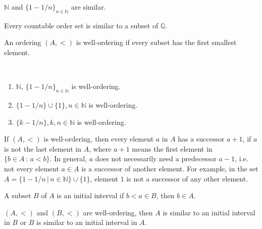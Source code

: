 \medskip

\begin{example}
$\mathbb{N}$ and $\{1 - 1/n\}_{n \in \mathbb{N}}$ are similar.
\end{example}

\medskip

\begin{theorem}
Every countable order set is similar to a subset of $\mathbb{Q}$.
\end{theorem}

\medskip

\begin{definition}
An ordering $(A,<)$ is well-ordering if every subset has the first smallest element.
\end{definition}

\medskip

\begin{example}
~\begin{enumerate}[label=(\alph*)]
    \item $\mathbb{N}$, $\{1 - 1/n\}_{n \in \mathbb{N}}$ is well-ordering.
    
    \item $\{1 - 1/n\} \cup \{1\}, n \in \mathbb{N}$ is well-ordering.
    
    \item $\{k - 1/n\}, k,n \in \mathbb{N}$ is well-ordering.
\end{enumerate}
\end{example}

\medskip

If $(A,<)$ is well-ordering, then every element $a$ in $A$ has a successor $a+1$, if $a$ is not the last element in $A$, where $a+1$ means the first element in $\{b \in A\, : \, a < b\}$. In general, $a$ does not necessarily need a predecessor $a-1$, i.e. not every element $a \in A$ is a successor of another element. For example, in the set $A = \{1 - 1/n\,|\, n\in \mathbb{N}\} \cup \{1\}$, element $1$ is not a successor of any other element.

\medskip

\begin{definition}
A subset $B$ of $A$ is an initial interval if $b < a \in B$, then $b \in A$.
\end{definition}

\medskip

\begin{theorem}
$(A,<)$ and $(B,<)$ are well-ordering, then $A$ is similar to an initial interval in $B$ or $B$ is similar to an initial interval in $A$.
\end{theorem}

